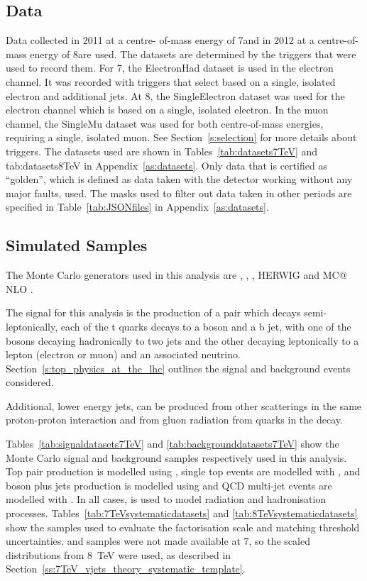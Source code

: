 \subsection{Data}
\label{ss:data}

Data collected in 2011 at a centre-  of-mass energy of 7\TeV and in 2012 at a centre-of-mass energy of
8\TeV are used. The datasets are determined by the triggers that were used to record them. For 7\TeV, the ElectronHad
dataset is used in the electron channel. It was recorded with triggers that select based on a single, isolated
electron and additional jets. At 8\TeV, the SingleElectron dataset was used for the electron channel
which is based on a single, isolated electron. In the muon channel, the SingleMu dataset was used for both
centre-of-mass energies, requiring a single, isolated muon. See Section~\ref{s:selection} for more
details about triggers. The datasets used are shown in Tables~\ref{tab:datasets7TeV} and {tab:datasets8TeV} in
Appendix~\ref{as:datasets}. Only data that is certified as “golden”, which is defined as data taken with the
detector working without any major faults, used. The masks used to filter out data taken in other periods are
specified in Table~\ref{tab:JSONfiles} in Appendix~\ref{as:datasets}.

\subsection{Simulated Samples}
\label{ss:simulated_samples}
The Monte Carlo generators used in this analysis are \MADGRAPH \cite{madgraph5}, \PYTHIA \cite{pythia8},
\POWHEG \cite{powheg_Nason,powheg_Frixione,powheg_Alioli}, HERWIG \cite{herwig} and MC$@$NLO
\cite{mcatnlo_Frixione1, mcatnlo_Frixione2}.

The signal for this analysis is the production of a \ttbar pair which decays semi-leptonically, \ie each of
the t quarks decays to a \W boson and a b jet, with one of the \W bosons decaying hadronically to two jets and
the other decaying leptonically to a lepton (electron or muon) and an associated neutrino.
Section~\ref{s:top_physics_at_the_lhc} outlines the signal and background events considered.

Additional, lower energy jets, can be produced from other scatterings in the same proton-proton interaction
and from gluon radiation from quarks in the decay. 

Tables~\ref{tab:signaldatasets7TeV} and \ref{tab:backgrounddatasets7TeV} show the Monte Carlo signal and
background samples respectively used in this analysis. Top pair production is modelled using \MADGRAPH, single
top events are modelled with \POWHEG, \W and \Z boson plus jets production is modelled using \MADGRAPH and QCD
multi-jet events are modelled with \PYTHIA. In all cases, \PYTHIA is used to model radiation and hadronisation
processes. Tables~\ref{tab:7TeVsystematicdatasets} and \ref{tab:8TeVsystematicdatasets} show the samples used
to evaluate the factorisation scale and matching threshold uncertainties. \WpJets and \ZpJets samples were not
made available at 7\TeV, so the scaled distributions from \SI{8}{\TeV} were used, as described in
Section~\ref{ss:7TeV_vjets_theory_systematic_template}.

